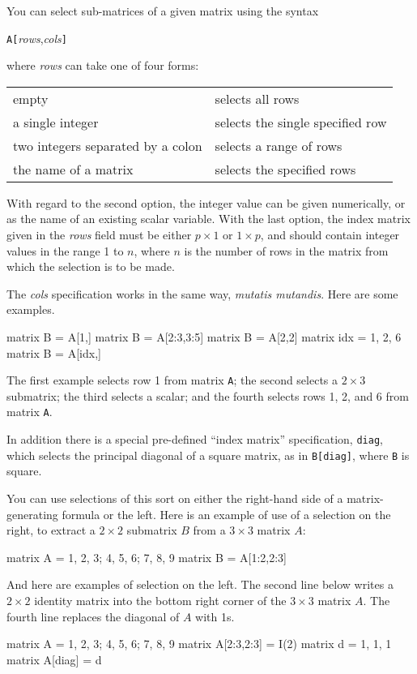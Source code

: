 You can select sub-matrices of a given matrix using the syntax

\texttt{A[}\textsl{rows},\textsl{cols}\texttt{]}

where \textsl{rows} can take one of four forms:

\begin{center}
\begin{tabular}{ll}
empty & selects all rows \\
a single integer & selects the single specified row \\
two integers separated by a colon & selects a range of rows \\
the name of a matrix & selects the specified rows \\
\end{tabular}
\end{center}

With regard to the second option, the integer value can be given
numerically, or as the name of an existing scalar variable.  With the
last option, the index matrix given in the \textsl{rows} field must be
either $p\times 1$ or $1\times p$, and should contain integer values
in the range 1 to $n$, where $n$ is the number of rows in the matrix
from which the selection is to be made.

The \textsl{cols} specification works in the same way, \textit{mutatis
  mutandis}.  Here are some examples.
%
\begin{code}
matrix B = A[1,]
matrix B = A[2:3,3:5]
matrix B = A[2,2]
matrix idx = { 1, 2, 6 }
matrix B = A[idx,]
\end{code}
%
The first example selects row 1 from matrix \texttt{A}; the second
selects a $2\times 3$ submatrix; the third selects a scalar; and
the fourth selects rows 1, 2, and 6 from matrix \texttt{A}.

In addition there is a special pre-defined ``index matrix''
specification, \texttt{diag}, which selects the principal diagonal of
a square matrix, as in \texttt{B[diag]}, where \texttt{B} is square.

You can use selections of this sort on either the right-hand side of
a matrix-generating formula or the left.  Here is an example of use of
a selection on the right, to extract a $2\times 2$ submatrix $B$ from a
$3\times 3$ matrix $A$:
%
\begin{code}
matrix A = { 1, 2, 3; 4, 5, 6; 7, 8, 9 }
matrix B = A[1:2,2:3]
\end{code}
%
And here are examples of selection on the left.  The second line below
writes a $2\times 2$ identity matrix into the bottom right corner of the
$3\times 3$ matrix $A$.  The fourth line replaces the diagonal of $A$ 
with 1s.
%
\begin{code}
matrix A = { 1, 2, 3; 4, 5, 6; 7, 8, 9 }
matrix A[2:3,2:3] = I(2)
matrix d = { 1, 1, 1 }
matrix A[diag] = d
\end{code}

